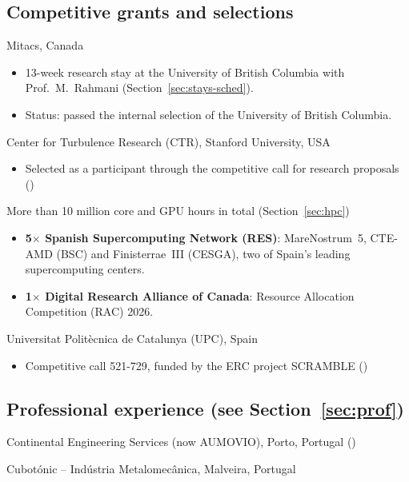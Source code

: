 \documentclass[11pt]{article}
\begin{document}
\subsection{Competitive grants and selections}
\begin{entries}
    {Mitacs, Canada}
  \begin{itemize}
    \item 13-week research stay at the University of British Columbia with Prof.\ M.\
    Rahmani (Section~\ref{sec:stays-sched}).
    \item Status: passed the internal selection of the University of British Columbia.
  \end{itemize}

    {Center for Turbulence Research (CTR), Stanford University, USA}
  \begin{itemize}
    \item Selected as a participant through the competitive call for research proposals
    (\certref{ctr}{certificate})
  \end{itemize}

    {More than 10 million core and GPU hours in total (Section~\ref{sec:hpc})}
  \begin{itemize}
    \item \textbf{5$\times$ Spanish Supercomputing Network (RES)}: MareNostrum~5,
    CTE-AMD (BSC) and \mbox{Finisterrae~III} (CESGA), two of Spain's leading supercomputing centers.
    \item \textbf{1$\times$ Digital Research Alliance of Canada}: Resource Allocation
    Competition (RAC) 2026.
  \end{itemize}

    {Universitat Polit\`ecnica de Catalunya (UPC), Spain}
  \begin{itemize}
    \item Competitive call 521-729, funded by the ERC project SCRAMBLE ()
  \end{itemize}
\end{entries}

\subsection[Professional experience]{Professional experience {\normalsize\mdseries(see Section~\ref{sec:prof})}}
\begin{entries}
    {Continental Engineering Services (now AUMOVIO), Porto, Portugal ()}

    {Cubot\'onic -- Ind\'ustria Metalomec\^anica, Malveira, Portugal}
\end{entries}
\end{document}
